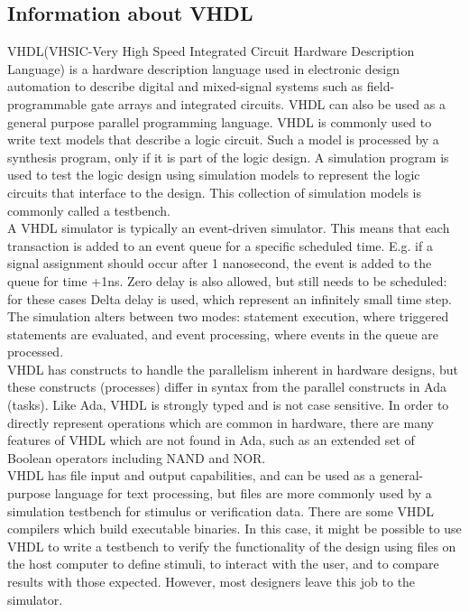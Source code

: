 \documentclass[12pt,a4paper]{article}
\begin{document}
\subsection{Information about VHDL}
VHDL(VHSIC-Very High Speed Integrated Circuit  Hardware Description Language)  is a hardware description language used in electronic design automation to describe digital and mixed-signal systems such as field-programmable gate arrays and integrated circuits. VHDL can also be used as a general purpose parallel programming language.
VHDL is commonly used to write text models that describe a logic circuit. Such a model is processed by a synthesis program, only if it is part of the logic design. A simulation program is used to test the logic design using simulation models to represent the logic circuits that interface to the design. This collection of simulation models is commonly called a testbench.\\
A VHDL simulator is typically an event-driven simulator. This means that each transaction is added to an event queue for a specific scheduled time. E.g. if a signal assignment should occur after 1 nanosecond, the event is added to the queue for time +1ns. Zero delay is also allowed, but still needs to be scheduled: for these cases Delta delay is used, which represent an infinitely small time step. The simulation alters between two modes: statement execution, where triggered statements are evaluated, and event processing, where events in the queue are processed.\\
VHDL has constructs to handle the parallelism inherent in hardware designs, but these constructs (processes) differ in syntax from the parallel constructs in Ada (tasks). Like Ada, VHDL is strongly typed and is not case sensitive. In order to directly represent operations which are common in hardware, there are many features of VHDL which are not found in Ada, such as an extended set of Boolean operators including NAND and NOR.\\
VHDL has file input and output capabilities, and can be used as a general-purpose language for text processing, but files are more commonly used by a simulation testbench for stimulus or verification data. There are some VHDL compilers which build executable binaries. In this case, it might be possible to use VHDL to write a testbench to verify the functionality of the design using files on the host computer to define stimuli, to interact with the user, and to compare results with those expected. However, most designers leave this job to the simulator.\\
\end{document}

